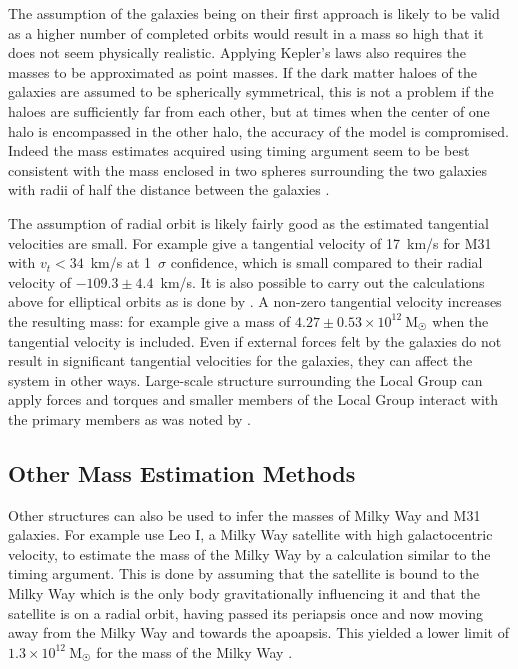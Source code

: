 \documentclass[english, oneside]{HYgradu}
\begin{document}
The assumption of the galaxies being on their first approach is likely to be valid as a higher number of completed orbits would result in a mass so high that it does not seem physically realistic. Applying Kepler's laws also requires the masses to be approximated as point masses.  If the dark matter haloes of the galaxies are assumed to be spherically symmetrical, this is not a problem if the haloes are sufficiently far from each other, but at times when the center of one halo is encompassed in the other halo, the accuracy of the model is compromised. Indeed the mass estimates acquired using timing argument seem to be best consistent with the mass enclosed in two spheres surrounding the two galaxies with radii of half the distance between the galaxies \citep{kroeker1991accuracy}. 

The assumption of radial orbit is likely fairly good as the estimated tangential velocities are small. For example \citet{vandermarel2012m31} give a tangential velocity of 17~km/s for M31 with $v_{t} < 34$~km/s at 1~$\sigma$ confidence, which is small compared to their radial velocity of $-109.3 \pm 4.4$~km/s. It is also possible to carry out the calculations above for elliptical orbits as is done by \citet{einasto1982mass}. A non-zero tangential velocity increases the resulting mass: for example \citet{vandermarel2012m31} give a mass of $4.27 \pm 0.53 \times 10^{12}~\mathrm{M_{\astrosun}}$ when the tangential velocity is included. Even if external forces felt by the galaxies do not result in significant tangential velocities for the galaxies, they can affect the system in other ways. Large-scale structure surrounding the Local Group can apply forces and torques and smaller members of the Local Group interact with the primary members as was noted by \citet{kahn1959intergalactic}.


\subsection{Other Mass Estimation Methods}

Other structures can also be used to infer the masses of Milky Way and M31 galaxies. For example \citet{zaritsky1989velocities} use Leo I, a Milky Way satellite with high galactocentric velocity, to estimate the mass of the Milky Way by a calculation similar to the timing argument. This is done by assuming that the satellite is bound to the Milky Way which is the only body gravitationally influencing it and that the satellite is on a radial orbit, having passed its periapsis once and now moving away from the Milky Way and towards the apoapsis. This yielded a lower limit of $1.3 \times 10^{12}~\mathrm{M_{\astrosun}}$ for the mass of the Milky Way \citep{zaritsky1989velocities}.
\end{document}
